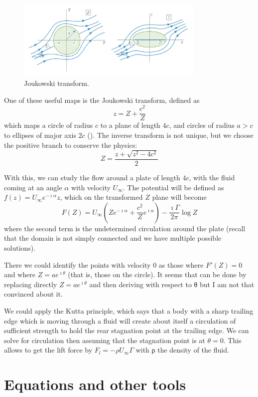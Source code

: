\documentclass[palatino]{epflnotes}
\begin{document}
\begin{figure}[hbtp]
\centering
\includegraphics[width=0.8\textwidth]{img/Joukowski.png}
\caption{Joukowski transform.}
\label{fig:Joukowski}
\end{figure}

One of these useful maps is the Joukowski transform, defined as \[ z = Z + \frac{c^2}{Z} \] which maps a circle of radius $c$ to a plane of length $4c$, and circles of radius $a > c$ to ellipses of major axis $2c$ (). The inverse transform is not unique, but we choose the positive branch to conserve the physics:
\[ Z = \frac{z + \sqrt{z^2 - 4c^2}}{2} \]

With this, we can study the flow around a plate of length $4c$, with the fluid coming at an angle $α$ with velocity $U_∞$. The potential will be defined as $f(z) = U_∞ e^{-\imath α} z$, which on the transformed $Z$ plane will become
\[ F(Z) = U_∞ \left(Z e^{-\imath α} + \frac{c^2}{Z} e^{\imath α}\right) - \frac{\imath Γ}{2π} \log Z \] where the second term is the undetermined circulation around the plate (recall that the domain is not simply connected and we have multiple possible solutions).

There we could identify the points with velocity $0$ as those where $F'(Z) = 0$ and where $Z = a e^{\imath θ}$ (that is, those on the circle). It seems that can be done by replacing directly $Z = ae^{\imath θ}$ and then deriving with respect to θ but I am not that convinced about it.

We could apply the Kutta principle, which says that a body with a sharp trailing edge which is moving through a fluid will create about itself a circulation of sufficient strength to hold the rear stagnation point at the trailing edge. We can solve for circulation then assuming that the stagnation point is at $θ = 0$. This allows to get the lift force by $F_l = - ρ U_∞ Γ$ with ρ the density of the fluid.

\appendix


\chapter{Equations and other tools}
\end{document}
